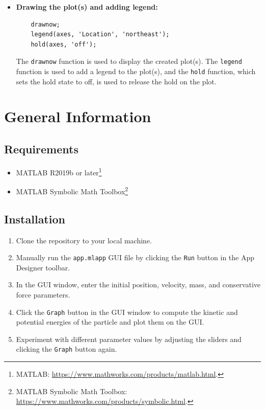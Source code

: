 \documentclass[13pt,a4paper]{report}
\begin{document}
\begin{itemize}[leftmargin=0.1cm]
\begin{verbatim}
    |\setcounter{FancyVerbLine}{65}|if PEVisibility
        plot(axes, T, PE, 'Color', 'blue', 'LineWidth', 1.5, 'DisplayName', 'PE');
    end
\end{verbatim}

The code checks if the visibility of kinetic and potential energy plots is set to true. If it is, the respective plots are created using the plot function.

\item \textbf{Drawing the plot(s) and adding legend:}

\begin{verbatim}
    drawnow;
    legend(axes, 'Location', 'northeast');
    hold(axes, 'off');
\end{verbatim}

The \texttt{drawnow} function is used to display the created plot(s). The \texttt{legend} function is used to add a legend to the plot(s), and the \texttt{hold} function, which sets the hold state to off, is used to release the hold on the plot.

\end{itemize}

\newpage
\section{General Information}
\subsection{Requirements}
\begin{itemize}[leftmargin=0.65cm,itemsep=0.15cm]
    \item MATLAB R2019b or later\footnote[1]{MATLAB: \url{https://www.mathworks.com/products/matlab.html}.}
    \item MATLAB Symbolic Math Toolbox\footnote[2]{MATLAB Symbolic Math Toolbox: \url{https://www.mathworks.com/products/symbolic.html}.}
\end{itemize}
\subsection{Installation}
\begin{enumerate}[leftmargin=0.6cm,itemindent=0.05cm]
    \item Clone the repository to your local machine.
    \item Manually run the \texttt{app.mlapp} GUI file by clicking the \texttt{Run} button in the App Designer toolbar.
    \item In the GUI window, enter the initial position, velocity, mass, and conservative force parameters.
    \item Click the \texttt{Graph} button in the GUI window to compute the kinetic and potential energies of the particle and plot them on the GUI.
    \item Experiment with different parameter values by adjusting the sliders and clicking the \texttt{Graph} button again.
\end{enumerate}
\end{document}
